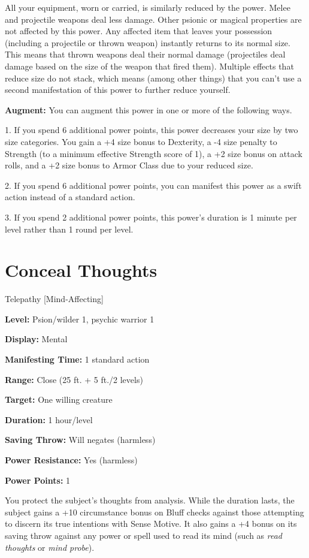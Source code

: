 \documentclass{article}
\begin{document}
All your equipment, worn or carried, is similarly reduced by the power. Melee and 
projectile weapons deal less damage. Other psionic or magical properties are not 
affected by this power. Any affected item that leaves your possession (including 
a projectile or thrown weapon) instantly returns to its normal size. This means 
that thrown weapons deal their normal damage (projectiles deal damage based on 
the size of the weapon that fired them). Multiple effects that reduce size do not 
stack, which means (among other things) that you can't use a second manifestation 
of this power to further reduce yourself.

\textbf{Augment:} You can augment this power in one or more of the following ways.

1. If you spend 6 additional power points, this power decreases your size by two 
size categories. You gain a +4 size bonus to Dexterity, a -4 size penalty to Strength 
(to a minimum effective Strength score of 1), a +2 size bonus on attack rolls, 
and a +2 size bonus to Armor Class due to your reduced size.

2. If you spend 6 additional power points, you can manifest this power as a swift 
action instead of a standard action.

3. If you spend 2 additional power points, this power's duration is 1 minute per 
level rather than 1 round per level.

\vspace{12pt}
\section*{Conceal Thoughts}

Telepathy [Mind-Affecting]

\textbf{Level:} Psion/wilder 1, psychic warrior 1

\textbf{Display:} Mental

\textbf{Manifesting Time:} 1 standard action

\textbf{Range:} Close (25 ft. + 5 ft./2 levels)

\textbf{Target:} One willing creature

\textbf{Duration:} 1 hour/level

\textbf{Saving Throw:} Will negates (harmless)

\textbf{Power Resistance:} Yes (harmless)

\textbf{Power Points:} 1

You protect the subject's thoughts from analysis. While the duration lasts, the 
subject gains a +10 circumstance bonus on Bluff checks against those attempting 
to discern its true intentions with Sense Motive. It also gains a +4 bonus on its 
saving throw against any power or spell used to read its mind (such as \textit{read 
thoughts }or \textit{mind probe}).
\end{document}
